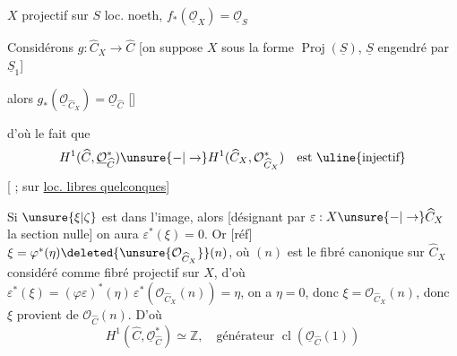 
$X$ projectif sur $S$ loc. noeth, \unsure{,} $f_*(\underline{\mathcal O}_X)=\underline{\mathcal O}_S$

Considérons $g:\widehat C_X\longrightarrow\widehat C$ [on suppose $X$ sous la forme $\operatorname{Proj}(\underline S)$,  $\underline S$ engendré par $\underline S_1$]

alors $g_*(\underline{\mathcal O}_{\widehat C_X})=\underline{\mathcal O}_{\widehat C}$ []

d'où le fait que
\[
H^1(\widehat C,\underline{\mathcal O}_{\widehat C}^*)\unsure{-|\to} H^1(\widehat C_X,\mathcal O_{\widehat C_X}^*)\quad\text{est \uline{injectif}}
\]
[  ; sur  \uline{loc. libres quelconques}]

Si  $\unsure{\xi|\zeta}$ est dans l'image, alors [désignant par $\varepsilon:X\unsure{-|\to}\widehat C_X$ la section nulle] on aura $\varepsilon^*(\xi)=0$. Or [réf] $\xi=\varphi^*(\eta)\deleted{\unsure{\mathcal O_{\widehat C_X}}}(n)$, où  $(n)$ est le fibré canonique sur $\widehat C_X$ considéré comme fibré projectif sur $X$, d'où $\varepsilon^*(\xi)=(\varphi\varepsilon)^*(\eta)\,\varepsilon^*(\mathcal O_{\widehat C_X}(n))=\eta$, on a $\eta=0$, donc $\xi=\mathcal O_{\widehat C_X}(n)$, donc $\xi$ provient de $\mathcal O_{\widehat C}(n)$. D'où
\[
\boxed{H^1(\widehat C,\underline{\mathcal O}_{\widehat C}^*)\simeq\mathbb Z,\quad\text{générateur }\operatorname{cl}(\underline{\mathcal O}_{\widehat C}(1))}
\]
